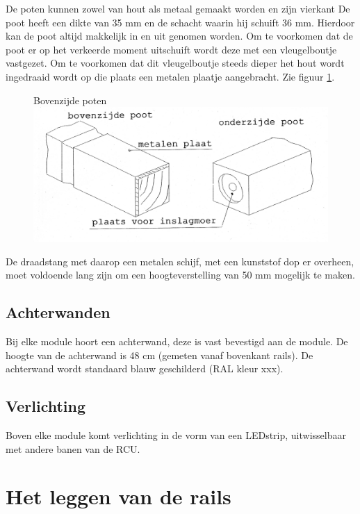 \documentclass[12pt,a4paper]{report}
\begin{document}
De poten kunnen zowel van hout als metaal gemaakt worden en zijn vierkant De poot heeft een dikte van 35 mm en de schacht waarin hij schuift 36 mm. Hierdoor kan de poot altijd makkelijk in en uit genomen worden. Om te voorkomen dat de poot er op het verkeerde moment uitschuift wordt deze met een vleugelboutje vastgezet. Om te voorkomen dat dit vleugelboutje steeds dieper het hout wordt ingedraaid wordt op die plaats een metalen plaatje aangebracht. Zie figuur \ref{figuur3}.

\begin{figure}[!ht]
  \captionbox
  {Bovenzijde poten\label{figuur3}}
  {\includegraphics[scale=0.2]{images/rcu_figuur3}}
\end{figure}

De draadstang met daarop een metalen schijf,  met een kunststof dop er overheen, moet voldoende lang zijn om een hoogteverstelling van 50 mm mogelijk te maken.

\section{Achterwanden}
\label{se:achterwanden}
Bij elke module hoort een achterwand, deze is vast bevestigd aan de module. De hoogte van de achterwand is 48 cm (gemeten vanaf bovenkant rails). De achterwand wordt standaard blauw geschilderd (RAL kleur xxx).

\section{Verlichting}
\label{se:verlichting}
Boven elke module komt verlichting in de vorm van een LEDstrip, uitwisselbaar met andere banen van de RCU.

\chapter{Het leggen van de rails}
\label{ch:rails}
\end{document}
